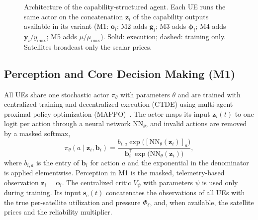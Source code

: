 \documentclass[journal]{IEEEtran}
\begin{document}
\begin{figure}[t]
{%
}
\caption{Architecture of the capability-structured agent. Each UE runs the
same actor on the concatenation $\mathbf{z}_i$ of the capability outputs
available in its variant (M1: $\mathbf{o}_i$; M2 adds $\mathbf{g}_i$; M3 adds
$\boldsymbol\phi_i$; M4 adds $\mathbf{y}_i/y_{\max}$; M5 adds $\mu/\mu_{\max}$).
Solid: execution; dashed: training only. Satellites broadcast only the scalar
prices.}
\label{fig:arch}
\end{figure}

\subsection{Perception and Core Decision Making (M1)}

All UEs share one stochastic actor $\pi_\theta$ with parameters $\theta$ and
are trained with centralized training and decentralized execution (CTDE)
using multi-agent proximal policy optimization (MAPPO)~\cite{yu2022mappo}. The
actor maps its input $\mathbf{z}_i(t)$ to one logit per action through a
neural network $\mathrm{NN}_\theta$, and invalid actions are removed by a
masked softmax,
\begin{equation}
\pi_\theta(a\mid\mathbf{z}_i,\mathbf{b}_i)=\frac{b_{i,a}\exp\big([\mathrm{NN}_\theta(\mathbf{z}_i)]_a\big)}{\mathbf{b}_i^{\mathsf T}\exp\big(\mathrm{NN}_\theta(\mathbf{z}_i)\big)},
\end{equation}
where $b_{i,a}$ is the entry of $\mathbf{b}_i$ for action $a$ and the
exponential in the denominator is applied elementwise. Perception in M1 is
the masked, telemetry-based observation $\mathbf{z}_i=\mathbf{o}_i$. The
centralized critic $V_\psi$ with parameters $\psi$ is used only during
training. Its input $\mathbf{s}_{\mathrm{c}}(t)$ concatenates the observations of all UEs
with the true per-satellite utilization and pressure $\Phi_\ell$, and, when
available, the satellite prices and the reliability multiplier.
\end{document}

